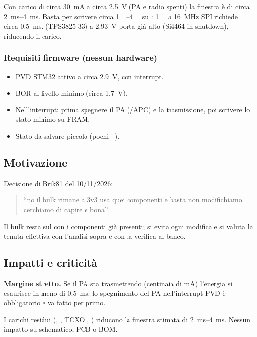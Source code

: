 Con carico di circa \SI{30}{\milli\ampere} a circa \SI{2,5}{\volt} (PA e radio spenti) la finestra è di circa \SIrange{2}{4}{\milli\second}. Basta per scrivere circa \SIrange{1}{4}{\kilo\byte} su : \SI{1}{\kilo\byte} a \SI{16}{\mega\hertz} SPI richiede circa \SI{0,5}{\milli\second}.  (TPS3825-33) a \SI{2,93}{\volt} porta già  alto (Si4464 in shutdown), riducendo il carico.

\subsubsection{Requisiti firmware (nessun hardware)}
\begin{itemize}
  \item PVD STM32 attivo a circa \SI{2,9}{\volt}, con interrupt.
  \item BOR al livello minimo (circa \SI{1,7}{\volt}).
  \item Nell'interrupt: prima spegnere il PA  (/APC) e la trasmissione, poi scrivere lo stato minimo su FRAM.
  \item Stato da salvare piccolo (pochi \si{\kilo\byte}).
\end{itemize}

\subsection{Motivazione}
Decisione di Brik81 del 10/11/2026:
\begin{quote}
``no il bulk rimane a 3v3 usa quei componenti e basta non modifichiamo cerchiamo di capire e bona''
\end{quote}
Il bulk resta sul  con i componenti già presenti; si evita ogni modifica e si valuta la tenuta effettiva con l'analisi sopra e con la verifica al banco.

\subsection{Impatti e criticità}
\begin{critbox}
\textbf{Margine stretto.} Se il PA sta trasmettendo (centinaia di \si{\milli\ampere}) l'energia si esaurisce in meno di \SI{0,5}{\milli\second}: lo spegnimento del PA nell'interrupt PVD è obbligatorio e va fatto per primo.
\end{critbox}
\begin{notebox}
I carichi residui (, , TCXO , ) riducono la finestra stimata di \SIrange{2}{4}{\milli\second}. Nessun impatto su schematico, PCB o BOM.
\end{notebox}

